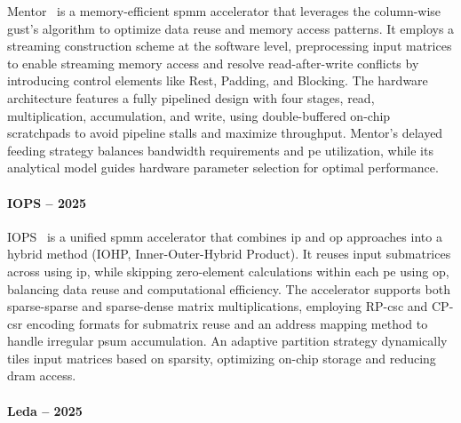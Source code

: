 Mentor~\cite{Lu2024_Mentor} is a memory-efficient \acrshort{spmm} accelerator that leverages the column-wise \acrlong{gust}'s algorithm to optimize data reuse and memory access patterns.
It employs a streaming construction scheme at the software level, preprocessing input matrices to enable streaming memory access and resolve read-after-write conflicts by introducing control elements like Rest, Padding, and Blocking.
The hardware architecture features a fully pipelined design with four stages, read, multiplication, accumulation, and write, using double-buffered on-chip scratchpads to avoid pipeline stalls and maximize throughput.
Mentor's delayed feeding strategy balances bandwidth requirements and \acrfull{pe} utilization, while its analytical model guides hardware parameter selection for optimal performance.

\paragraph{IOPS -- 2025}

IOPS~\cite{Sun2025_IOPS} is a unified \acrshort{spmm} accelerator that combines \acrfull{ip} and \acrfull{op} approaches into a hybrid method (IOHP, Inner-Outer-Hybrid Product).
It reuses input submatrices across  using \acrshort{ip}, while skipping zero-element calculations within each \acrshort{pe} using \acrshort{op}, balancing data reuse and computational efficiency.
The accelerator supports both sparse-sparse and sparse-dense matrix multiplications, employing RP-\acrshort{csc} and CP-\acrshort{csr} encoding formats for submatrix reuse and an address mapping method to handle irregular \gls{psum} accumulation.
An adaptive partition strategy dynamically \glspl{tile} input matrices based on sparsity, optimizing on-chip storage and reducing \acrshort{dram} access.

\paragraph{Leda -- 2025}

